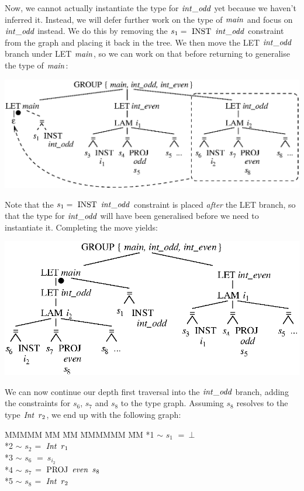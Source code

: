 Now, we cannot actually instantiate the type for $\operatorname{\mathit{int\_odd}}$ yet because we haven't inferred it. Instead, we will defer further work on the type of $\operatorname{\mathit{main}}$ and focus on $\operatorname{\mathit{int\_odd}}$ instead. We do this by removing the $s_1 = \ \rINST \ \iintOdd$ constraint from the graph and placing it back in the tree. We then move the LET $\operatorname{\mathit{int\_odd}}$ branch under LET $\operatorname{\mathit{main}}$, so we can work on that before returning to generalise the type of $\operatorname{\mathit{main}}$:
\begin{center}
\includegraphics{3-Inference/fig/ordering/tree-main-gen-move}
\end{center}
Note that the $s_1 = \ \rINST \ \iintOdd$ constraint is placed \emph{after} the LET branch, so that the type for $\operatorname{\mathit{int\_odd}}$ will have been generalised before we need to instantiate it. Completing the move yields:
\begin{center}
\includegraphics{3-Inference/fig/ordering/tree-main-gen-moved}
\end{center}

We can now continue our depth first traversal into the $\operatorname{\mathit{int\_odd}}$ branch, adding the constraints for $s_6$, $s_7$ and $s_8$ to the type graph. Assuming $s_8$ resolves to the type $\operatorname{\mathit{Int}} \ r_2$, we end up with the following graph:
\begin{tabbing}
MMMMM	\= MM 	\= MM 		\= MMMMMM 	\= MM \kill
	\> *1	\> $\sim$	\> $s_1$	\> $= \ \bot$ \\
	\> *2	\> $\sim$	\> $s_2$	\> $= \ \operatorname{\mathit{Int}}  \ r_1$ \\
	\> *3	\> $\sim$	\> $s_6$	\> $= \ s_{i_2}$ \\
	\> *4	\> $\sim$	\> $s_7$	\> $= \ \textrm{PROJ} \ \operatorname{\mathit{even}} \ s_8$ \\
	\> *5	\> $\sim$	\> $s_8$	\> $= \ \operatorname{\mathit{Int}} \ r_2$
\end{tabbing}

